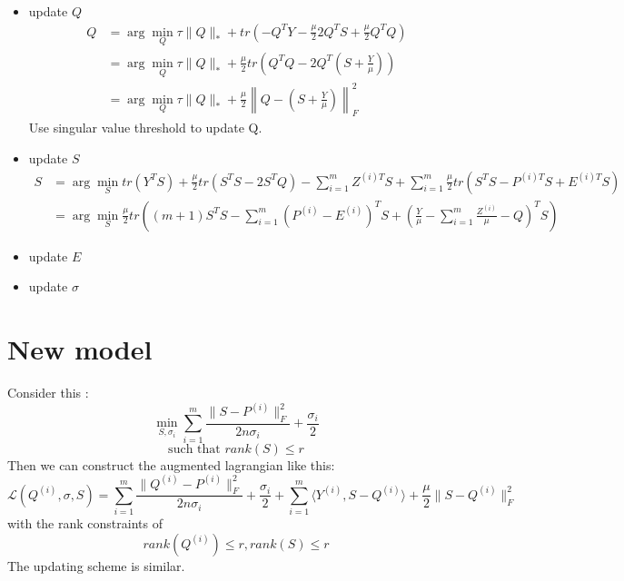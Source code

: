 \documentclass[11pt]{article}
\newcommand{\norm}[1]{\left\lVert#1\right\rVert}
\begin{document}
\begin{itemize}
\item update $Q$
\begin{align*}
Q & = \arg \min_Q \tau\|Q\|_* + tr(-Q^TY - \frac{\mu}{2} 2Q^TS + \frac{\mu}{2} Q^TQ)\\
&= \arg \min_Q \tau \|Q\|_* + \frac{\mu}{2} tr(Q^TQ - 2Q^T(S + \frac{Y}{\mu}))\\
&= \arg \min_Q \tau \|Q\|_* + \frac{\mu}{2}\norm{Q - \left( S + \frac{Y}{\mu} \right)}_F^2
\end{align*}
Use singular value threshold to update Q.
\item update $S$
\begin{align*}
S &= \arg \min_S tr(Y^TS) + \frac{\mu}{2} tr(S^TS - 2S^TQ) - \sum_{i=1}^{m} Z^{(i)T}S + \sum_{i=1}^{m} \frac{\mu}{2} tr(S^TS - P^{(i)T}S + E^{(i)T}S)\\
&= \arg \min_S \frac{\mu}{2} tr\left(
(m+1)S^TS - \sum_{i=1}^{m} (P^{(i)}-E^{(i)})^TS +\left(\frac{Y}{\mu} - \sum_{i=1}^{m} \frac{Z^{(i)}}{\mu} - Q\right)^TS
 \right)
\end{align*}
\item update $E$
\item update $\sigma$
\end{itemize}

\section*{New model}

Consider this :
$$\min_{S,\sigma_i} \sum_{i=1}^{m} \frac{\|S-P^{(i)}\|_F^2}{2n\sigma_i} + \frac{\sigma_i}{2}$$
$$\text{such that }rank(S) \leq r$$
Then we can construct the augmented lagrangian like this:
$$
\mathcal{L}(Q^{(i)}, \sigma, S) = \sum_{i=1}^{m} \frac{\|Q^{(i)} - P^{(i)}\|_F^2}{2n\sigma_i} + \frac{\sigma_i}{2} + \sum_{i=1}^{m} \langle Y^{(i)}, S-Q^{(i)} \rangle + \frac{\mu}{2} \|S - Q^{(i)}\|^2_F
$$
with the rank constraints of 
$$rank(Q^{(i)}) \leq r, rank(S) \leq r$$
The updating scheme is similar.
\end{document}
